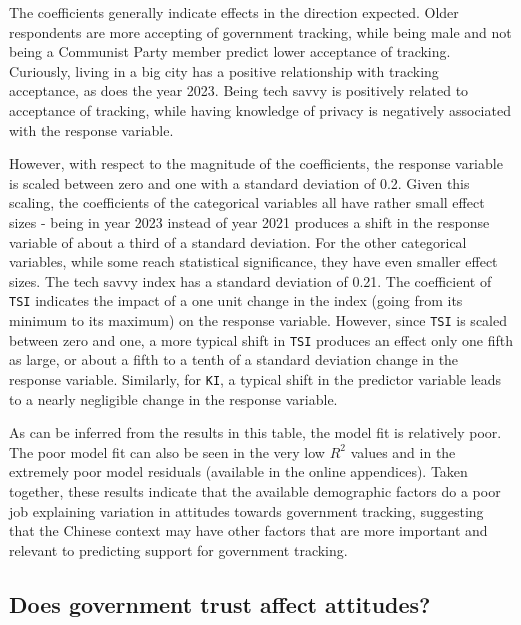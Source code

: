 \documentclass[
  letterpaper,
  DIV=11,
  numbers=noendperiod]{scrartcl}
\begin{document}
The coefficients generally indicate effects in the direction expected.
Older respondents are more accepting of government tracking, while being
male and not being a Communist Party member predict lower acceptance of
tracking. Curiously, living in a big city has a positive relationship
with tracking acceptance, as does the year 2023. Being tech savvy is
positively related to acceptance of tracking, while having knowledge of
privacy is negatively associated with the response variable.

However, with respect to the magnitude of the coefficients, the response
variable is scaled between zero and one with a standard deviation of
0.2. Given this scaling, the coefficients of the categorical variables
all have rather small effect sizes - being in year 2023 instead of year
2021 produces a shift in the response variable of about a third of a
standard deviation. For the other categorical variables, while some
reach statistical significance, they have even smaller effect sizes. The
tech savvy index has a standard deviation of 0.21. The coefficient of
\texttt{TSI} indicates the impact of a one unit change in the index
(going from its minimum to its maximum) on the response variable.
However, since \texttt{TSI} is scaled between zero and one, a more
typical shift in \texttt{TSI} produces an effect only one fifth as
large, or about a fifth to a tenth of a standard deviation change in the
response variable. Similarly, for \texttt{KI}, a typical shift in the
predictor variable leads to a nearly negligible change in the response
variable.

As can be inferred from the results in this table, the model fit is
relatively poor. The poor model fit can also be seen in the very low
\(R^2\) values and in the extremely poor model residuals (available in
the online appendices). Taken together, these results indicate that the
available demographic factors do a poor job explaining variation in
attitudes towards government tracking, suggesting that the Chinese
context may have other factors that are more important and relevant to
predicting support for government tracking.

\subsection{Does government trust affect
attitudes?}\label{does-government-trust-affect-attitudes}
\end{document}
